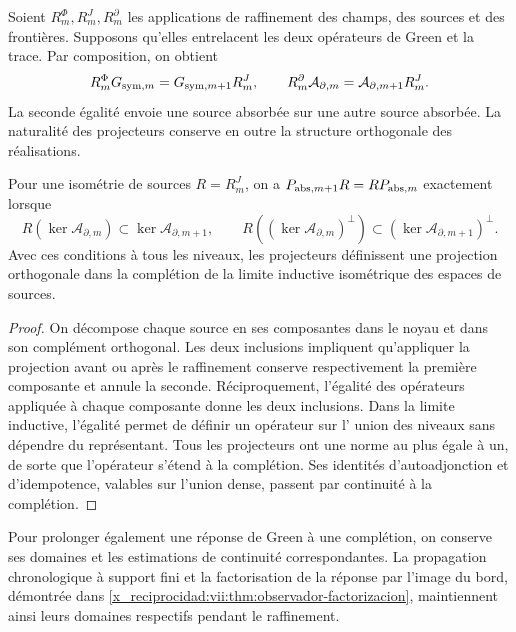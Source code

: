Soient \(R_m^\Phi,R_m^J,R_m^\partial\) les applications de raffinement des
champs, des sources et des frontières. Supposons qu'elles entrelacent les deux opérateurs de Green et la
trace. Par composition, on obtient
\begin{equation}
 R_m^\Phi G_{{\rm sym},m}=G_{{\rm sym},m+1}R_m^J,\qquad
 R_m^\partial\mathcal A_{\partial,m}
 =\mathcal A_{\partial,m+1}R_m^J.
 \label{x_reciprocidad:vii:eq:refinamiento-lectura-absorcion}
\end{equation}
La seconde égalité envoie une source absorbée sur une autre source absorbée.
La naturalité des projecteurs conserve en outre la structure
orthogonale des réalisations.

\begin{proposition}
\label{x_reciprocidad:vii:prop:naturalidad-proyeccion-absorcion}
Pour une isométrie de sources \(R=R_m^J\), on a \(P_{{\rm abs},m+1}R=RP_{{\rm abs},m}\) exactement lorsque
\[
 R(\ker\mathcal A_{\partial,m})
       \subset\ker\mathcal A_{\partial,m+1},\qquad
 R((\ker\mathcal A_{\partial,m})^\perp)
       \subset(\ker\mathcal A_{\partial,m+1})^\perp.
\]
Avec ces conditions à tous les niveaux, les projecteurs définissent une projection orthogonale dans la complétion de la limite inductive isométrique des espaces de sources.
\end{proposition}
\begin{proof}
On décompose chaque source en ses composantes dans le noyau et dans son
complément orthogonal. Les deux inclusions impliquent qu'appliquer la
projection avant ou après le raffinement conserve respectivement la
première composante et annule la seconde. Réciproquement, l'égalité des
opérateurs appliquée à chaque composante donne les deux inclusions.
Dans la limite inductive, l'égalité permet de définir un opérateur sur l'
union des niveaux sans dépendre du représentant. Tous les projecteurs
ont une norme au plus égale à un, de sorte que l'opérateur s'étend à la
complétion. Ses identités d'autoadjonction et d'idempotence, valables sur
l'union dense, passent par continuité à la complétion.
\end{proof}

Pour prolonger également une réponse de Green à une complétion, on
conserve ses domaines et les estimations de continuité correspondantes.
La propagation chronologique à support fini et la factorisation de la
réponse par l'image du bord, démontrée dans
\ref{x_reciprocidad:vii:thm:observador-factorizacion}, maintiennent ainsi leurs domaines
respectifs pendant le raffinement.

